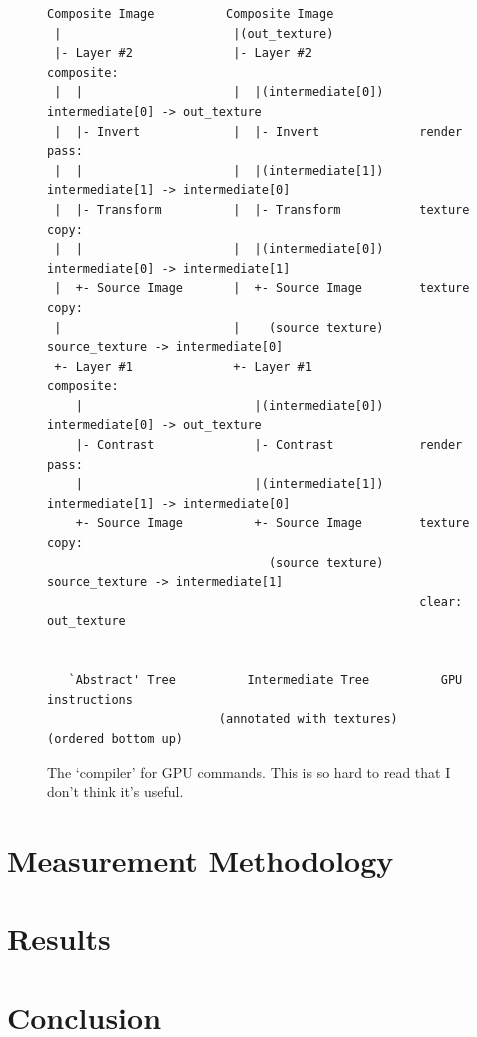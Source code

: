 \documentclass[12pt]{article}
\begin{document}
\begin{figure}
        \begin{verbatim}
Composite Image          Composite Image
 |                        |(out_texture)
 |- Layer #2              |- Layer #2               composite:
 |  |                     |  |(intermediate[0])       intermediate[0] -> out_texture
 |  |- Invert             |  |- Invert              render pass:
 |  |                     |  |(intermediate[1])       intermediate[1] -> intermediate[0]
 |  |- Transform          |  |- Transform           texture copy:
 |  |                     |  |(intermediate[0])       intermediate[0] -> intermediate[1]
 |  +- Source Image       |  +- Source Image        texture copy:
 |                        |    (source texture)       source_texture -> intermediate[0]
 +- Layer #1              +- Layer #1               composite:
    |                        |(intermediate[0])       intermediate[0] -> out_texture
    |- Contrast              |- Contrast            render pass:
    |                        |(intermediate[1])       intermediate[1] -> intermediate[0]
    +- Source Image          +- Source Image        texture copy:
                               (source texture)       source_texture -> intermediate[1]
                                                    clear: out_texture


   `Abstract' Tree          Intermediate Tree          GPU instructions
                        (annotated with textures)     (ordered bottom up)
        \end{verbatim}
    \caption{The `compiler' for GPU commands.  This is so hard to read that I don't think it's
    useful.}\label{fig:gpu-cmd-gen}
\end{figure}






\pagebreak

\section{Measurement Methodology}

\section{Results}

\section{Conclusion}



\pagebreak

\begin{thebibliography}{99}
\end{thebibliography}
\end{document}
